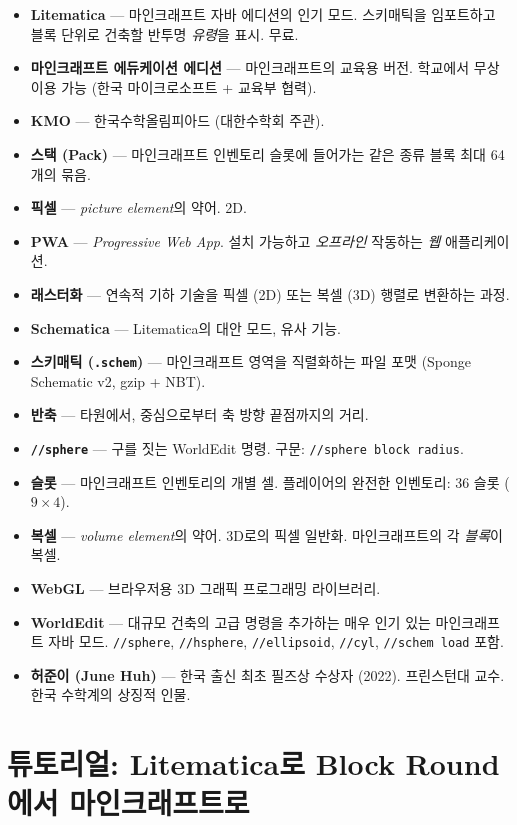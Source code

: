 \documentclass[12pt,a4paper]{scrartcl}
\newcommand{\code}[1]{\texttt{\small #1}}
\newcommand{\acc}[1]{\textcolor{accent}{\textbf{#1}}}
\newcommand{\cmd}[1]{\textcolor{earth}{\texttt{\small #1}}}
\begin{document}
\begin{itemize}[leftmargin=1.4em,itemsep=0.3em,topsep=0.3em]
  \item \acc{Litematica} --- 마인크래프트 자바 에디션의 인기 모드. 스키매틱을 임포트하고 블록 단위로 건축할 반투명 \emph{유령}을 표시. 무료.
  \item \acc{마인크래프트 에듀케이션 에디션} --- 마인크래프트의 교육용 버전. 학교에서 무상 이용 가능 (한국 마이크로소프트 + 교육부 협력).
  \item \acc{KMO} --- 한국수학올림피아드 (대한수학회 주관).
  \item \acc{스택 (Pack)} --- 마인크래프트 인벤토리 슬롯에 들어가는 같은 종류 블록 최대 64개의 묶음.
  \item \acc{픽셀} --- \emph{picture element}의 약어. 2D.
  \item \acc{PWA} --- \emph{Progressive Web App}. 설치 가능하고 \emph{오프라인} 작동하는 \emph{웹} 애플리케이션.
  \item \acc{래스터화} --- 연속적 기하 기술을 픽셀 (2D) 또는 복셀 (3D) 행렬로 변환하는 과정.
  \item \acc{Schematica} --- Litematica의 대안 모드, 유사 기능.
  \item \acc{스키매틱 (\texttt{.schem})} --- 마인크래프트 영역을 직렬화하는 파일 포맷 (Sponge Schematic v2, gzip + NBT).
  \item \acc{반축} --- 타원에서, 중심으로부터 축 방향 끝점까지의 거리.
  \item \acc{\code{//sphere}} --- 구를 짓는 WorldEdit 명령. 구문: \cmd{//sphere block radius}.
  \item \acc{슬롯} --- 마인크래프트 인벤토리의 개별 셀. 플레이어의 완전한 인벤토리: 36 슬롯 ($9 \times 4$).
  \item \acc{복셀} --- \emph{volume element}의 약어. 3D로의 픽셀 일반화. 마인크래프트의 각 \emph{블록}이 복셀.
  \item \acc{WebGL} --- 브라우저용 3D 그래픽 프로그래밍 라이브러리.
  \item \acc{WorldEdit} --- 대규모 건축의 고급 명령을 추가하는 매우 인기 있는 마인크래프트 자바 모드. \cmd{//sphere}, \cmd{//hsphere}, \cmd{//ellipsoid}, \cmd{//cyl}, \cmd{//schem load} 포함.
  \item \acc{허준이 (June Huh)} --- 한국 출신 최초 필즈상 수상자 (2022). 프린스턴대 교수. 한국 수학계의 상징적 인물.
\end{itemize}

\newpage
\section{튜토리얼: Litematica로 Block Round에서 마인크래프트로}\label{ap:litematica}
\end{document}

